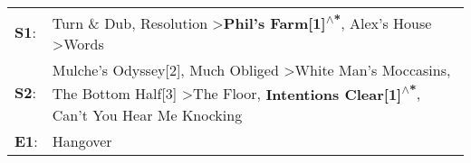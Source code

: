 \begin{supertabular}{p{0.03\textwidth}p{0.92\textwidth}}
 \textbf{S1}:  &                                                                                                                                    Turn \& Dub\textsuperscript{}, \enspace Resolution\textsuperscript{} \textgreater \enspace \textbf{Phil's Farm[1]\textsuperscript{$\wedge$*}}, \enspace Alex's House\textsuperscript{} \textgreater \enspace Words\textsuperscript{}  \enspace  \\
 \textbf{S2}:  &  Mulche's Odyssey[2]\textsuperscript{}, \enspace Much Obliged\textsuperscript{} \textgreater \enspace White Man's Moccasins\textsuperscript{}, \enspace The Bottom Half[3]\textsuperscript{} \textgreater \enspace The Floor\textsuperscript{}, \enspace \textbf{Intentions Clear[1]\textsuperscript{$\wedge$*}}, \enspace Can't You Hear Me Knocking\textsuperscript{}  \enspace  \\
 \textbf{E1}:  &                                                                                                                                                                                                                                                                                                                                              Hangover\textsuperscript{}  \enspace  \\
\end{supertabular}
